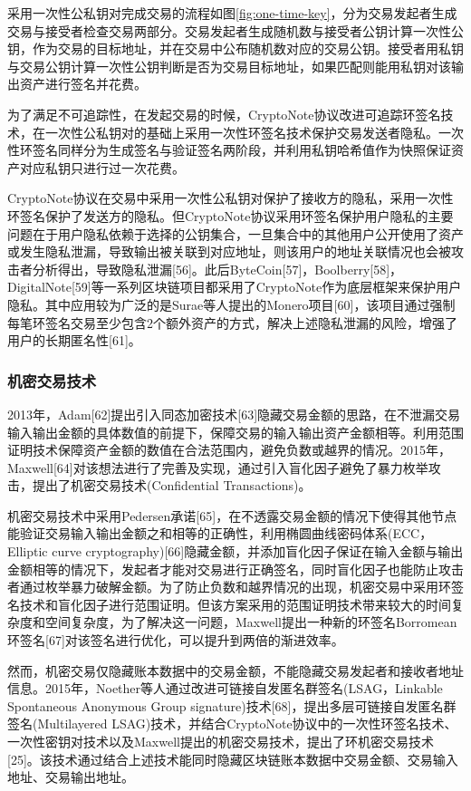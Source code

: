 采用一次性公私钥对完成交易的流程如图\ref{fig:one-time-key}，分为交易发起者生成交易与接受者检查交易两部分。交易发起者生成随机数与接受者公钥计算一次性公钥，作为交易的目标地址，并在交易中公布随机数对应的交易公钥。接受者用私钥与交易公钥计算一次性公钥判断是否为交易目标地址，如果匹配则能用私钥对该输出资产进行签名并花费。

为了满足不可追踪性，在发起交易的时候，CryptoNote协议改进可追踪环签名技术，在一次性公私钥对的基础上采用一次性环签名技术保护交易发送者隐私。一次性环签名同样分为生成签名与验证签名两阶段，并利用私钥哈希值作为快照保证资产对应私钥只进行过一次花费。

CryptoNote协议在交易中采用一次性公私钥对保护了接收方的隐私，采用一次性环签名保护了发送方的隐私。但CryptoNote协议采用环签名保护用户隐私的主要问题在于用户隐私依赖于选择的公钥集合，一旦集合中的其他用户公开使用了资产或发生隐私泄漏，导致输出被关联到对应地址，则该用户的地址关联情况也会被攻击者分析得出，导致隐私泄漏[56]。此后ByteCoin[57]，Boolberry[58]，DigitalNote[59]等一系列区块链项目都采用了CryptoNote作为底层框架来保护用户隐私。其中应用较为广泛的是Surae等人提出的Monero项目[60]，该项目通过强制每笔环签名交易至少包含2个额外资产的方式，解决上述隐私泄漏的风险，增强了用户的长期匿名性[61]。

\subsubsection{机密交易技术}

2013年，Adam[62]提出引入同态加密技术[63]隐藏交易金额的思路，在不泄漏交易输入输出金额的具体数值的前提下，保障交易的输入输出资产金额相等。利用范围证明技术保障资产金额的数值在合法范围内，避免负数或越界的情况。2015年，Maxwell[64]对该想法进行了完善及实现，通过引入盲化因子避免了暴力枚举攻击，提出了机密交易技术(Confidential Transactions)。

机密交易技术中采用Pedersen承诺[65]，在不透露交易金额的情况下使得其他节点能验证交易输入输出金额之和相等的正确性，利用椭圆曲线密码体系(ECC，Elliptic curve cryptography)[66]隐藏金额，并添加盲化因子保证在输入金额与输出金额相等的情况下，发起者才能对交易进行正确签名，同时盲化因子也能防止攻击者通过枚举暴力破解金额。为了防止负数和越界情况的出现，机密交易中采用环签名技术和盲化因子进行范围证明。但该方案采用的范围证明技术带来较大的时间复杂度和空间复杂度，为了解决这一问题，Maxwell提出一种新的环签名Borromean环签名[67]对该签名进行优化，可以提升到两倍的渐进效率。

然而，机密交易仅隐藏账本数据中的交易金额，不能隐藏交易发起者和接收者地址信息。2015年，Noether等人通过改进可链接自发匿名群签名(LSAG，Linkable Spontaneous Anonymous Group signature)技术[68]，提出多层可链接自发匿名群签名(Multilayered LSAG)技术，并结合CryptoNote协议中的一次性环签名技术、一次性密钥对技术以及Maxwell提出的机密交易技术，提出了环机密交易技术[25]。该技术通过结合上述技术能同时隐藏区块链账本数据中交易金额、交易输入地址、交易输出地址。

